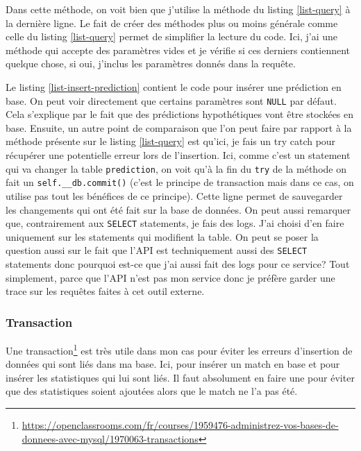 \documentclass[a4paper,14pt]{extarticle}
\begin{document}
{

Dans cette méthode, on voit bien que j'utilise la méthode du listing \ref{list-query} à la dernière ligne. Le fait de créer des méthodes plus ou moins générale comme celle du listing \ref{list-query} permet de simplifier la lecture du code. Ici, j'ai une méthode qui accepte des paramètres vides et je vérifie si ces derniers contiennent quelque chose, si oui, j'inclus les paramètres donnés dans la requête.


Le listing \ref{list-insert-prediction} contient le code pour insérer une prédiction en base. On peut voir directement que certains paramètres sont \texttt{NULL} par défaut. Cela s'explique par le fait que des prédictions hypothétiques vont être stockées en base. Ensuite, un autre point de comparaison que l'on peut faire par rapport à la méthode présente sur le listing \ref{list-query} est qu'ici, je fais un try catch pour récupérer une potentielle erreur lors de l'insertion. Ici, comme c'est un statement qui va changer la table \texttt{prediction}, on voit qu'à la fin du \texttt{try} de la méthode on fait un \texttt{self.\_\_db.commit()} (c'est le principe de transaction mais dans ce cas, on utilise pas tout les bénéfices de ce principe). Cette ligne permet de sauvegarder les changements qui ont été fait sur la base de données. On peut aussi remarquer que, contrairement aux \texttt{SELECT} statements, je fais des logs. J'ai choisi d'en faire uniquement sur les statements qui modifient la table.  
On peut se poser la question aussi sur le fait que l'API est techniquement aussi des \texttt{SELECT} statements donc pourquoi est-ce que j'ai aussi fait des logs pour ce service? Tout simplement, parce que l'API n'est pas mon service donc je préfère garder une trace sur les requêtes faites à cet outil externe.

\subsubsection{Transaction}

Une transaction\footnote{\url{https://openclassrooms.com/fr/courses/1959476-administrez-vos-bases-de-donnees-avec-mysql/1970063-transactions}} est très utile dans mon cas pour éviter les erreurs d'insertion de données qui sont liés dans ma base. Ici, pour insérer un match en base et pour insérer les statistiques qui lui sont liés. Il faut absolument en faire une pour éviter que des statistiques soient ajoutées alors que le match ne l'a pas été.


}
\end{document}
